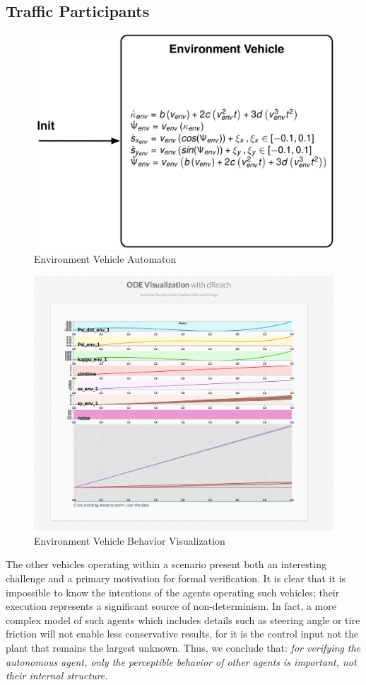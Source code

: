\subsection{Traffic Participants}
\label{sect:traffic-participants}
	\begin{figure}[h]
		\centering
		\includegraphics[scale=0.35]{figures/environment}
		\caption{Environment Vehicle Automaton}
	\end{figure}
		\begin{figure}[h]
			\centering
			\includegraphics[width=\textwidth]{figures/dreachenv}
			\caption{Environment Vehicle Behavior Visualization}
		\end{figure}
The other vehicles operating within a scenario present both an interesting challenge and a primary motivation for formal verification. It is clear that it is impossible to know the intentions of the agents operating such vehicles; their execution represents a significant source of non-determinism. In fact, a more complex model of such agents which includes details such as steering angle or tire friction will not enable less conservative results, for it is the control input not the plant that remains the largest unknown. Thus, we conclude that:
{\it for verifying the autonomous agent, only the perceptible behavior of other agents is important, not their internal structure.}



